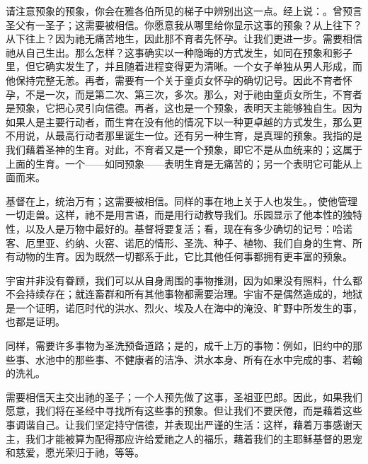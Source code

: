 请注意预象的预象，你会在雅各伯所见的梯子中辨别出这一点。经上说：。曾预言圣父有一圣子；这需要被相信。你愿意我从哪里给你显示这事的预象？从上往下？从下往上？因为祂无痛苦地生，因此那不育者先怀孕。让我们更进一步。需要相信祂从自己生出。那么怎样？这事确实以一种隐晦的方式发生，如同在预象和影子里，但它确实发生了，并且随着进程变得更为清晰。一个女子单独从男人形成，而他保持完整无恙。再者，需要有一个关于童贞女怀孕的确切记号。因此不育者怀孕，不是一次，而是第二次、第三次，多次。那么，对于祂由童贞女所生，不育者是预象，它把心灵引向信德。再者，这也是一个预象，表明天主能够独自生。因为如果人是主要行动者，而生育在没有他的情况下以一种更卓越的方式发生，那么更不用说，从最高行动者那里诞生一位。还有另一种生育，是真理的预象。我指的是我们藉着圣神的生育。对此，不育者又是一个预象，即它不是从血统来的；这属于上面的生育。一个——如同预象——表明生育是无痛苦的；另一个表明它可能从上面而来。\par

基督在上，统治万有；这需要被相信。同样的事在地上关于人也发生。，使他管理一切走兽。这样，祂不是用言语，而是用行动教导我们。乐园显示了他本性的独特性，以及人是万物中最好的。基督将要复活；看，现在有多少确切的记号：哈诺客、厄里亚、约纳、火窑、诺厄的情形、圣洗、种子、植物、我们自身的生育、所有动物的生育。因为既然一切都系于此，它比其他任何事都拥有更丰富的预象。\par

宇宙并非没有眷顾，我们可以从自身周围的事物推测，因为如果没有照料，什么都不会持续存在；就连畜群和所有其他事物都需要治理。宇宙不是偶然造成的，地狱是一个证明，诺厄时代的洪水、烈火、埃及人在海中的淹没、旷野中所发生的事，也都是证明。\par

同样，需要许多事物为圣洗预备道路；是的，成千上万的事物：例如，旧约中的那些事、水池中的那些事、不健康者的洁净、洪水本身、所有在水中完成的事、若翰的洗礼。\par

需要相信天主交出祂的圣子；一个人预先做了这事，圣祖亚巴郎。因此，如果我们愿意，我们将在圣经中寻找所有这些事的预象。但让我们不要厌倦，而是藉着这些事调谐自己。让我们坚定持守信德，并表现出严谨的生活：这样，藉着万事感谢天主，我们才能被算为配得那应许给爱祂之人的福乐，藉着我们的主耶稣基督的恩宠和慈爱，愿光荣归于祂，等等。\par


